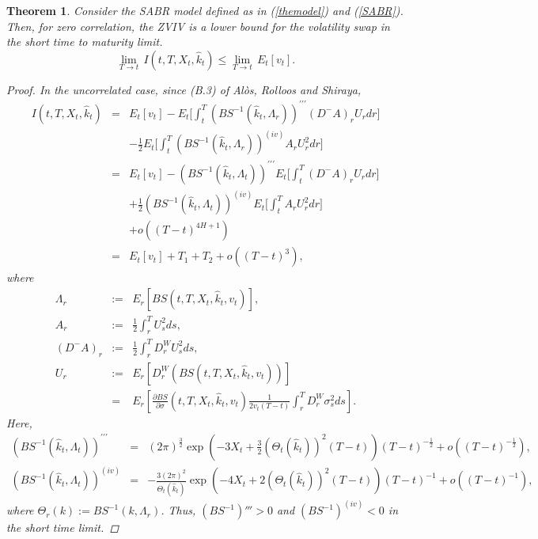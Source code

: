 \documentclass[11pt]{article}
\newtheorem{theorem}{Theorem}
\begin{document}
\begin{theorem}Consider the SABR model defined as in (\ref{themodel}) and (\ref{SABR}). Then, for zero correlation, the ZVIV is a lower bound for the volatility swap in the short time to maturity limit.
\begin{equation}
\lim_{T \to t} \, I( t,T,X_t,\hat{k}_t) \leq \lim_{T \to t} \,  E_{t}[v_{t}].
\end{equation}
\begin{proof}
In the uncorrelated case, since (B.3) of Al\`os, Rolloos and Shiraya,
\begin{eqnarray}
\label{primerpas}
I\left( t,T,X_t,\hat{k}_t\right) &=& E_{t}\left[ v_{t}\right] -  E_t\Bigg[\int_{t}^{T}\left( BS^{-1}\left( \hat{k}_t, \Lambda_r\right)\right) ^{\prime \prime\prime} (D^-A)_r U_r dr\Bigg]\nonumber\\
&&- \frac12 E_t\Bigg[
\int_{t}^{T}\left( BS^{-1}\left( \hat{k}_t, \Lambda_r\right)\right) ^{(iv)} A_r U_r^2 dr \Bigg]
\label{I-E[v]}\nonumber\\
&=& 
E_{t}\left[ v_{t}\right] -\left( BS^{-1}\left( \hat{k}_t, \Lambda_t\right)\right) ^{\prime \prime\prime} E_t\Bigg[\int_{t}^{T}(D^-A)_r U_r dr\Bigg]\nonumber\\
&&+ \frac12 \left( BS^{-1}\left( \hat{k}_t, \Lambda_t\right)\right) ^{(iv)} E_t\Bigg[
\int_{t}^{T} A_r U_r^2 dr \Bigg]\nonumber\\
&&+o((T-t)^{4H+1})\nonumber\\
&=& E_{t}\left[ v_{t}\right] + T_1 + T_2 +o((T-t)^{3}),
\end{eqnarray}
where 
\begin{eqnarray}
\Lambda _{r}&:=&E_{r}\left[ BS\left( t,T,X_t,\hat{k}_t,v_{t}\right) \right],\\
A_r&:=&\frac12 \int_{r}^{T} U_{s}^{2}ds,\\
(D^-A)_r&:=&\frac{1}{2}\int^T_r D_r^W U^2_s ds,\\
U_{r}&:=&E_{r}\left[D_r^W\left(BS(t,T,X_t,\hat{k}_t,v_t)\right)\right]\nonumber\\
&=&E_r\left[\frac{\partial BS}{\partial \sigma}(t,T,X_t,\hat{k}_t,v_t)\frac{1}{2v_t(T-t)}\int_r^T D_r^W\sigma_s^2 ds\right].
\end{eqnarray}
Here,
\begin{eqnarray}
\label{terceraderivada}
\left( BS^{-1}\left( \hat{k}_t, \Lambda_t\right)\right) ^{\prime \prime\prime}
&=&(2\pi)^{\frac32}\exp\left(-3X_t+\frac{3}{2}(\Theta_t(\hat{k}_t))^2(T-t)\right)(T-t)^{-\frac12}+o\left((T-t)^{-\frac{1}{2}}\right),\\
\label{derivada4}
\left( BS^{-1}\left( \hat{k}_t, \Lambda_t\right)\right) ^{(iv)}&=&-\frac{3(2\pi)^{2}}{\Theta_t(\hat{k}_t)}\exp\left(-4X_t+2(\Theta_t(\hat{k}_t))^2(T-t)\right)(T-t)^{-1} + o\left((T-t)^{-1}\right),
\end{eqnarray}
where $\Theta_{r}(k):=BS^{-1}(k,\Lambda_r)$.
Thus, $(BS^{-1})'''>0$ and $(BS^{-1})^{(iv)}<0$ in the short time limit.


\end{proof}
\end{theorem}
\end{document}
